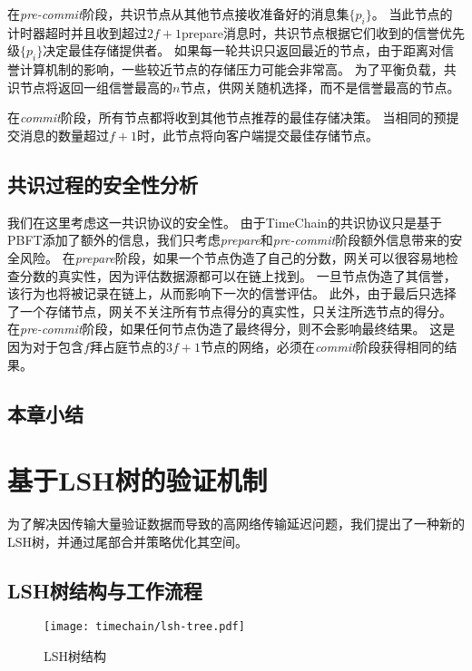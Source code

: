 在\textit{pre-commit}阶段，共识节点从其他节点接收准备好的消息集$\{p_i\}$。
当此节点的计时器超时并且收到超过$2f+1$prepare消息时，共识节点根据它们收到的信誉优先级$\{p_i\}$决定最佳存储提供者。
如果每一轮共识只返回最近的节点，由于距离对信誉计算机制的影响，一些较近节点的存储压力可能会非常高。
为了平衡负载，共识节点将返回一组信誉最高的$n$节点，供网关随机选择，而不是信誉最高的节点。

在\textit{commit}阶段，所有节点都将收到其他节点推荐的最佳存储决策。
当相同的预提交消息的数量超过$f+1$时，此节点将向客户端提交最佳存储节点。

\section{共识过程的安全性分析}
我们在这里考虑这一共识协议的安全性。
由于TimeChain的共识协议只是基于PBFT添加了额外的信息，我们只考虑\textit{prepare}和\textit{pre-commit}阶段额外信息带来的安全风险。
在\textit{prepare}阶段，如果一个节点伪造了自己的分数，网关可以很容易地检查分数的真实性，因为评估数据源都可以在链上找到。
一旦节点伪造了其信誉，该行为也将被记录在链上，从而影响下一次的信誉评估。
此外，由于最后只选择了一个存储节点，网关不关注所有节点得分的真实性，只关注所选节点的得分。
在\textit{pre-commit}阶段，如果任何节点伪造了最终得分，则不会影响最终结果。
这是因为对于包含$f$拜占庭节点的$3f+1$节点的网络，必须在\textit{commit}阶段获得相同的结果。

\section{本章小结}

\chapter{基于LSH树的验证机制}
\label{sec:lsh}
为了解决因传输大量验证数据而导致的高网络传输延迟问题，我们提出了一种新的LSH树，并通过尾部合并策略优化其空间。

\section{LSH树结构与工作流程}

\begin{figure}[t]
    \centering
	\begin{minipage}{0.65\linewidth}
        \centering
        \texttt{[image: timechain/lsh-tree.pdf]}
        \caption{LSH树结构}
        \label{fig:lsh_tree}
	\end{minipage}
\end{figure}

